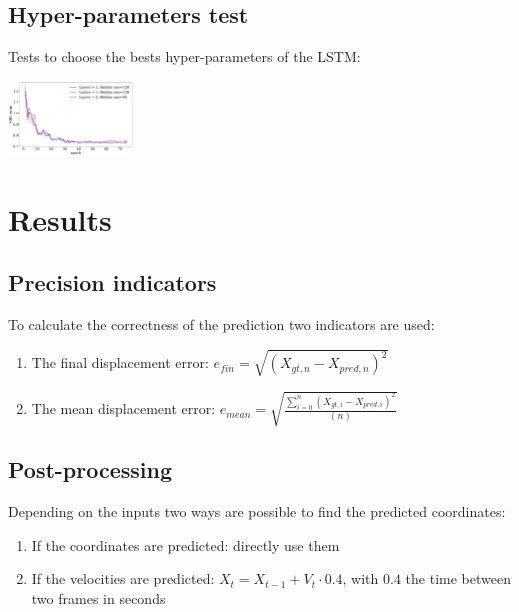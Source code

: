 \documentclass[a0,portrait]{a0poster}
\begin{document}
\begin{multicols}{2}
\subsection*{Hyper-parameters test}
Tests to choose the bests hyper-parameters of the LSTM:\\
\centerline {\includegraphics[width=0.25\textwidth]{figure/hyperparam}}


\section*{Results}
\subsection*{Precision indicators}
To calculate the correctness of the prediction two indicators are used:
\begin{enumerate}
\justifying
\item The final displacement error: $e_{fin} = \sqrt{(X_{gt,n}-X_{pred,n})^2}$
\item The mean displacement error: $e_{mean} = \sqrt{\frac{\sum_{i=0}^n(X_{gt,i}-X_{pred,i})^2}{(n)}}$
\end{enumerate}

\subsection*{Post-processing}
Depending on the inputs two ways are possible to find the predicted coordinates:
\begin{enumerate}
\justifying
\item If the coordinates are predicted: directly use them
\item If the velocities are predicted: $X_{t} = X_{t-1} + V_{t}\cdot 0.4$, with $0.4$ the time between two frames in seconds
\end{enumerate}


\end{multicols}
\end{document}
